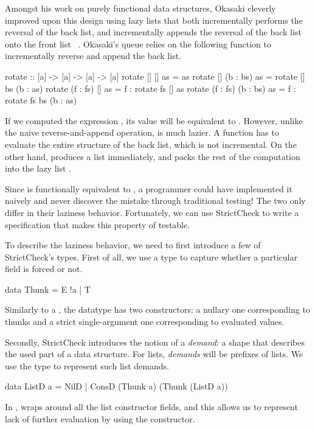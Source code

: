 \documentclass[acmsmall,review]{acmart}\settopmatter{}
\begin{document}
Amongst his work on purely functional data structures\cite{Okasaki},
Okasaki cleverly improved upon this design using lazy lists that both
incrementally performs the reversal of the back list, and
incrementally appends the reversal of the back list onto the front
list ~\cite{Okasaki95simpleand}. Okasaki's queue relies on the
following  function to incrementally reverse and append the
back list.
\begin{inlinecode}
  rotate :: [a] -> [a] -> [a] -> [a]
  rotate      []       []  as =                       as
  rotate      []  (b : bs) as =     rotate [] bs (b : as)
  rotate (f : fs)      []  as = f : rotate fs []      as
  rotate (f : fs) (b : bs) as = f : rotate fs bs (b : as)
\end{inlinecode}
If we computed the expression , its value
will be equivalent to . However, unlike
the naive reverse-and-append operation,  is much
lazier. A  function has to evaluate the entire structure
of the back list, which is not incremental. On the other
hand,  produces a list immediately, and packs the rest of
the computation into the lazy list .

Since  is functionally equivalent to , a programmer could have implemented it naively and never
discover the mistake through traditional testing! The two only differ
in their laziness behavior. Fortunately, we can use StrictCheck to
write a specification that makes this property of 
testable.

To describe the laziness behavior, we need to first introduce a few of
StrictCheck's types. First of all, we use a type  to capture
whether a particular field is forced or not.
%
\begin{inlinecode}
  data Thunk = E !a | T
\end{inlinecode}
%
Similarly to a , the  datatype has two
constructors: a nullary one  corresponding to thunks and a
strict single-argument one  corresponding to evaluated values.

Secondly, StrictCheck introduces the notion of a \textit{demand}: a
shape that describes the used part of a data structure. For
lists, \textit{demands} will be prefixes of lists. We use the
type  to represent such list demands.
%
\begin{inlinecode}
  data ListD a = NilD
               | ConsD (Thunk a) (Thunk (ListD a))
\end{inlinecode}
%
In ,  wraps around all the list constructor
fields, and this allows us to represent lack of further evaluation by
using the  constructor.
\end{document}
